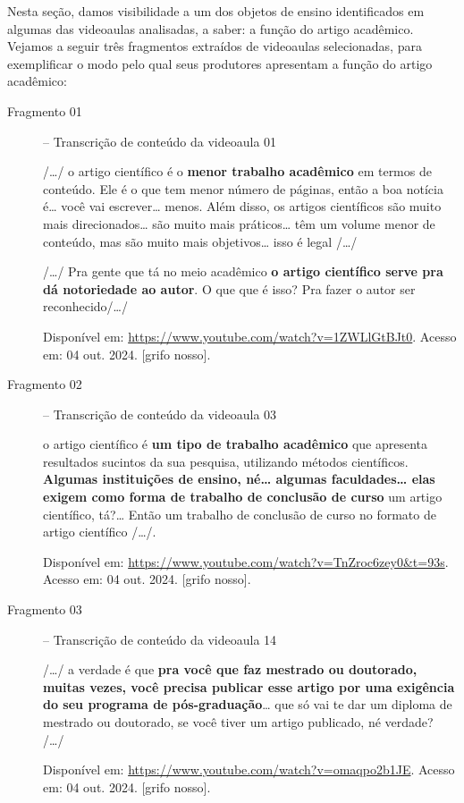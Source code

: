 Nesta seção, damos visibilidade a um dos objetos de ensino identificados
em algumas das videoaulas analisadas, a saber: a função do artigo
acadêmico. Vejamos a seguir três fragmentos extraídos de videoaulas
selecionadas, para exemplificar o modo pelo qual seus produtores
apresentam a função do artigo acadêmico:

\begin{description}
    \item[Fragmento 01\label{frag01}] -- Transcrição de conteúdo da videoaula 01 

    /\ldots/ o artigo científico é o \textbf{menor trabalho acadêmico} em
termos de conteúdo. Ele é o que tem menor número de páginas, então a boa
notícia é\ldots{} você vai escrever\ldots{} menos. Além disso, os
artigos científicos são muito mais direcionados\ldots{} são muito mais
práticos\ldots{} têm um volume menor de conteúdo, mas são muito mais
objetivos\ldots{} isso é legal /\ldots/

    /\ldots/ Pra gente que tá no meio acadêmico \textbf{o artigo científico
serve pra dá notoriedade ao autor}. O que que é isso? Pra fazer o autor
ser reconhecido/\ldots/

    Disponível em: \url{https://www.youtube.com/watch?v=1ZWLlGtBJt0}. Acesso
em: 04 out. 2024. {[}grifo nosso{]}.

    \item[Fragmento 02\label{frag02}] -- Transcrição de conteúdo da videoaula 03

    o artigo científico é \textbf{um tipo de trabalho acadêmico} que
apresenta resultados sucintos da sua pesquisa, utilizando métodos
científicos. \textbf{Algumas instituições de ensino, né\ldots{} algumas
faculdades\ldots{} elas exigem como forma de trabalho de conclusão de
curso} um artigo científico, tá?\ldots{} Então um trabalho de conclusão
de curso no formato de artigo científico /\ldots/.

    Disponível em: \url{https://www.youtube.com/watch?v=TnZroc6zey0\&t=93s}.
Acesso em: 04 out. 2024. {[}grifo nosso{]}.

    \item[Fragmento 03\label{frag03}] -- Transcrição de conteúdo da videoaula 14

    /\ldots/ a verdade é que \textbf{pra você que faz mestrado ou doutorado,
muitas vezes, você precisa publicar esse artigo por uma exigência do seu
programa de pós-graduação}\ldots{} que só vai te dar um diploma de
mestrado ou doutorado, se você tiver um artigo publicado, né verdade?
/\ldots/

    Disponível em: \url{https://www.youtube.com/watch?v=omaqpo2b1JE}. Acesso
em: 04 out. 2024. {[}grifo nosso{]}.
\end{description}
 












